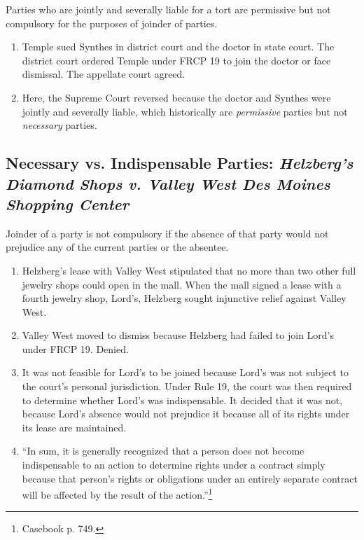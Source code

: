 Parties who are jointly and severally liable for a tort are permissive but not 
compulsory for the purposes of joinder of parties.

\begin{enumerate}
    \item Temple sued Synthes in district court and the doctor in state court. 
    The district court ordered Temple under FRCP 19 to join the doctor or face 
    dismissal. The appellate court agreed.
    \item Here, the Supreme Court reversed because the doctor and Synthes were 
    jointly and severally liable, which historically are \emph{permissive} 
    parties but not \emph{necessary} parties.
\end{enumerate}

\subsection{Necessary vs. Indispensable Parties: \emph{Helzberg's Diamond 
Shops v. Valley West Des Moines Shopping Center}}

Joinder of a party is not compulsory if the absence of that party would not 
prejudice any of the current parties or the absentee.

\begin{enumerate}
    \item Helzberg's lease with Valley West stipulated that no more than two 
    other full jewelry shops could open in the mall. When the mall signed a 
    lease with a fourth jewelry shop, Lord's, Helzberg sought injunctive 
    relief against Valley West.
    \item Valley West moved to dismiss because Helzberg had failed to join 
    Lord's under FRCP 19. Denied.
    \item It was not feasible for Lord's to be joined because Lord's was not 
    subject to the court's personal jurisdiction. Under Rule 19, the court was 
    then required to determine whether Lord's was indispensable. It decided 
    that it was not, because Lord's absence would not prejudice it because all 
    of its rights under its lease are maintained.
    \item ``In sum, it is generally recognized that a person does not become 
    indispensable to an action to determine rights under a contract simply 
    because that person's rights or obligations under an entirely separate 
    contract will be affected by the result of the action.''\footnote{Casebook 
    p. 749.}
\end{enumerate}

